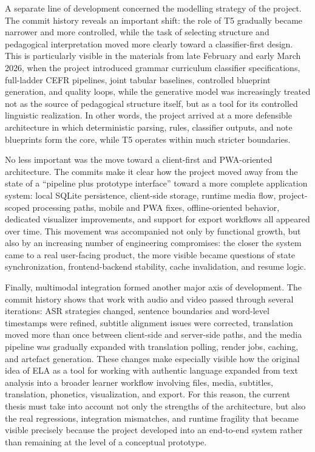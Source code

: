 \documentclass[12pt,a4paper,oneside]{report}
\begin{document}
A separate line of development concerned the modelling strategy of the project. The commit history reveals an important shift: the role of T5 gradually became narrower and more controlled, while the task of selecting structure and pedagogical interpretation moved more clearly toward a classifier-first design. This is particularly visible in the materials from late February and early March 2026, when the project introduced grammar curriculum classifier specifications, full-ladder CEFR pipelines, joint tabular baselines, controlled blueprint generation, and quality loops, while the generative model was increasingly treated not as the source of pedagogical structure itself, but as a tool for its controlled linguistic realization. In other words, the project arrived at a more defensible architecture in which deterministic parsing, rules, classifier outputs, and note blueprints form the core, while T5 operates within much stricter boundaries.

No less important was the move toward a client-first and PWA-oriented architecture. The commits make it clear how the project moved away from the state of a ``pipeline plus prototype interface'' toward a more complete application system: local SQLite persistence, client-side storage, runtime media flow, project-scoped processing paths, mobile and PWA fixes, offline-oriented behavior, dedicated visualizer improvements, and support for export workflows all appeared over time. This movement was accompanied not only by functional growth, but also by an increasing number of engineering compromises: the closer the system came to a real user-facing product, the more visible became questions of state synchronization, frontend-backend stability, cache invalidation, and resume logic.

Finally, multimodal integration formed another major axis of development. The commit history shows that work with audio and video passed through several iterations: ASR strategies changed, sentence boundaries and word-level timestamps were refined, subtitle alignment issues were corrected, translation moved more than once between client-side and server-side paths, and the media pipeline was gradually expanded with translation polling, render jobs, caching, and artefact generation. These changes make especially visible how the original idea of ELA as a tool for working with authentic language expanded from text analysis into a broader learner workflow involving files, media, subtitles, translation, phonetics, visualization, and export. For this reason, the current thesis must take into account not only the strengths of the architecture, but also the real regressions, integration mismatches, and runtime fragility that became visible precisely because the project developed into an end-to-end system rather than remaining at the level of a conceptual prototype.
\end{document}
